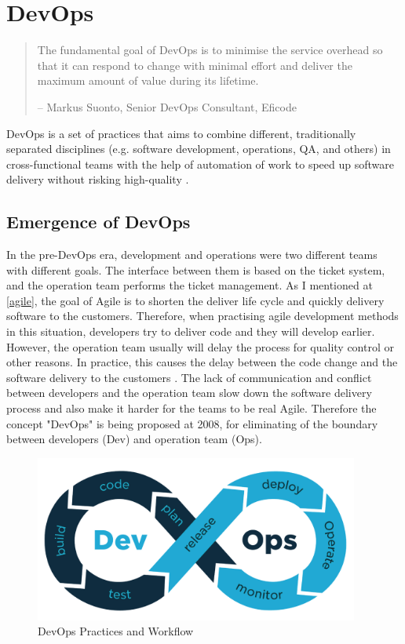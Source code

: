 \section{DevOps}
\begin{quotation}
    The fundamental goal of DevOps is to minimise the service overhead so that it can respond to change with minimal effort and deliver the maximum amount of value during its lifetime.
    \begin{flushright}
        -- Markus Suonto, Senior DevOps Consultant, Eficode
    \end{flushright}
\end{quotation}
\label{devops}
DevOps is a set of practices that aims to combine different, traditionally separated disciplines (e.g. software development, operations, QA, and others) in cross-functional teams with the help of automation of work to speed up software delivery without risking high-quality \cite{bass2015devops}.
\subsection{Emergence of DevOps}
In the pre-DevOps era, development and operations were two different teams with different goals. The interface between them is based on the ticket system, and the operation team performs the ticket management. As I mentioned at \ref{agile}, the goal of Agile is to shorten the deliver life cycle and quickly delivery software to the customers. Therefore, when practising agile development methods in this situation, developers try to deliver code and they will develop earlier.
However, the operation team usually will delay the process for quality control or other reasons. In practice, this causes the delay between the code change and the software delivery to the customers \cite{leite2019survey}. The lack of communication and conflict between developers and the operation team slow down the software delivery process and also make it harder for the teams to be real Agile. Therefore the concept "DevOps" is being proposed at 2008, for eliminating of the boundary between developers (Dev) and operation team (Ops).
\begin{figure}[h]
    \centering
    \includegraphics[width=0.95\textwidth]{pics/DevOps.png}
    \caption{DevOps Practices and Workflow \cite{DevOpsin72:online}}
    \label{fig:DevOps}
\end{figure}
